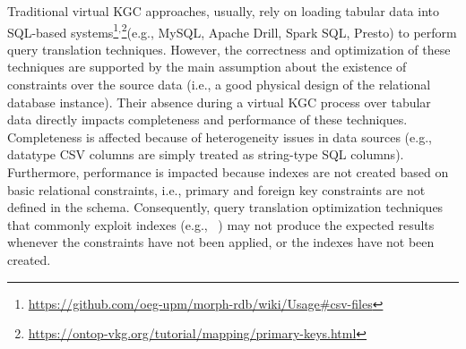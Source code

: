 Traditional virtual KGC approaches, usually, rely on loading tabular data into SQL-based systems\footnote{\url{https://github.com/oeg-upm/morph-rdb/wiki/Usage\#csv-files}}$^,$\footnote{\url{https://ontop-vkg.org/tutorial/mapping/primary-keys.html}}(e.g., MySQL, Apache Drill, Spark SQL, Presto) to perform query translation techniques. However, the correctness and optimization of these techniques are supported by the main assumption about the existence of constraints over the source data (i.e., a good physical design of the relational database instance). Their absence during a virtual KGC process over tabular data directly impacts completeness and performance of these techniques. Completeness is affected because of heterogeneity issues in data sources (e.g., datatype CSV columns are simply treated as string-type SQL columns). Furthermore, performance is impacted because indexes are not created based on basic relational constraints, i.e., primary and foreign key constraints are not defined in the schema. Consequently, query translation optimization techniques that commonly exploit indexes (e.g., ~\citep{rodriguez2015efficient,priyatna2014formalisation}) may not produce the expected results whenever the constraints have not been applied, or the indexes have not been created.

